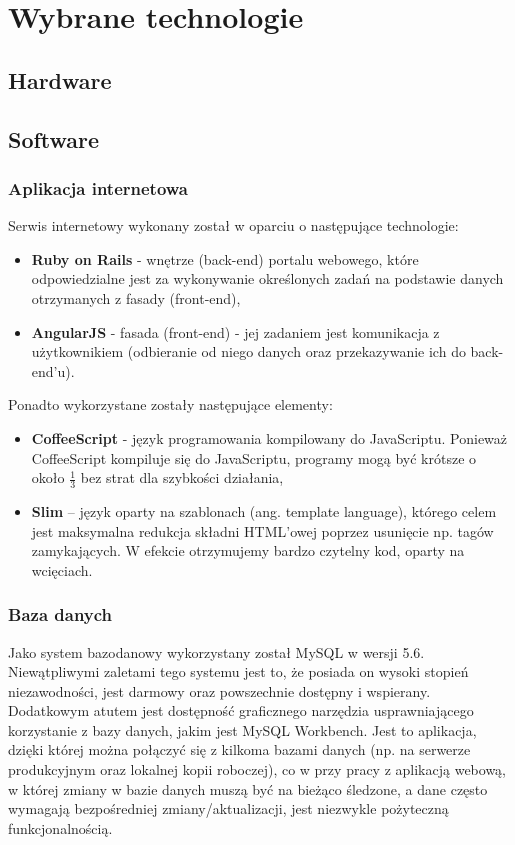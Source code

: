 \documentclass[eng,oneside]{mgr}
\begin{document}
\chapter{Wybrane technologie}
\section{Hardware}
\section{Software}
\subsection{Aplikacja internetowa}
Serwis internetowy wykonany został w oparciu o następujące technologie:
\begin{itemize}
	\item \textbf{Ruby on Rails} - wnętrze (back-end) portalu webowego, które odpowiedzialne jest za wykonywanie określonych zadań na podstawie danych otrzymanych z fasady (front-end),
	\item \textbf{AngularJS} - fasada (front-end) - jej zadaniem jest komunikacja z użytkownikiem (odbieranie od niego danych oraz przekazywanie ich do back-end'u).
\end{itemize}
Ponadto wykorzystane zostały następujące elementy:
\begin{itemize}
	\item \textbf{CoffeeScript} - język programowania kompilowany do JavaScriptu. Ponieważ CoffeeScript kompiluje się do JavaScriptu, programy mogą być krótsze o około $\frac{1}{3}$ bez strat dla szybkości działania,
	\item \textbf{Slim} – język oparty na szablonach (ang. template language), którego celem jest maksymalna redukcja składni HTML’owej poprzez usunięcie np. tagów zamykających. W efekcie otrzymujemy bardzo czytelny kod, oparty na wcięciach.
\end{itemize}

\subsection{Baza danych}
Jako system bazodanowy wykorzystany został MySQL w wersji 5.6. Niewątpliwymi zaletami tego systemu jest to, że posiada on wysoki stopień niezawodności, jest darmowy oraz powszechnie dostępny i wspierany. Dodatkowym atutem jest dostępność graficznego narzędzia usprawniającego korzystanie z bazy danych, jakim jest MySQL Workbench. Jest to aplikacja, dzięki której można połączyć się z kilkoma bazami danych (np. na serwerze produkcyjnym oraz lokalnej kopii roboczej), co w przy pracy z aplikacją webową, w której zmiany w bazie danych muszą być na bieżąco śledzone, a dane często wymagają bezpośredniej zmiany/aktualizacji, jest niezwykle pożyteczną funkcjonalnością.
\end{document}

